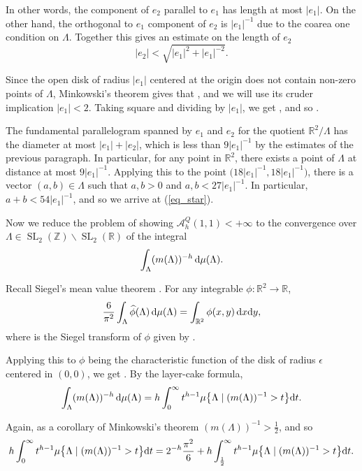 \documentclass[pdftex]{sigma}
\numberwithin{equation}{section}
\theoremstyle{definition}
\begin{document}
In other words, the component of $e_2$ parallel to $e_1$ has length at most $|e_1|$. On the other hand, the orthogonal to $e_1$ component of $e_2$ is $|e_1|^{-1}$ due to the coarea one condition on $\Lambda$. Together this gives an estimate on the length of $e_2$
\[|e_2|<\sqrt{|e_1|^2+|e_1|^{-2}}.\]

Since the open disk of radius $|e_1|$ centered at the origin does not contain non-zero points of $\Lambda$, Minkowski's theorem \cite{minkowski} gives that , and we will use its cruder implication $|e_1|<2$. Taking square and dividing by $|e_1|$, we get , and so .

The fundamental parallelogram spanned by $e_1$ and $e_2$ for the quotient $\mathbb{R}^2\slash\Lambda$ has the diameter at most $|e_1|+|e_2|$, which is less than $9|e_1|^{-1}$ by the estimates of the previous paragraph. In particular, for any point in $\mathbb{R}^2$, there exists a point of $\Lambda$ at distance at most $9|e_1|^{-1}$. Applying this to the point $\bigl(18|e_1|^{-1},18|e_1|^{-1}\bigr)$, there is a vector $(a,b)\in\Lambda$ such that $a,b>0$ and $a,b<27|e_1|^{-1}$. In particular, $a+b<54|e_1|^{-1}$, and so we arrive at (\ref{eq_star}).

Now we reduce the problem of showing $\mathcal{A}^Q_h(1,1)<+\infty$ to the convergence over $\Lambda\in\operatorname{SL}_2(\mathbb{Z})\backslash\operatorname{SL}_2(\mathbb{R})$ of the integral \[\int_\Lambda (m(\Lambda))^{-h}\, {\rm d}\mu(\Lambda).\]

Recall Siegel's mean value theorem \cite{siegel}. For any integrable $\phi\colon\mathbb{R}^2\rightarrow\mathbb{R}$,
\[
\frac{6}{\pi^2}\int_\Lambda\widehat\phi(\Lambda)\, {\rm d}\mu(\Lambda)=\int_{\mathbb{R}^2}\phi(x,y)\, {\rm d}x{\rm d}y,
\]
where \smash{$\widehat\phi$} is the Siegel transform of $\phi$ given by .

Applying this to $\phi$ being the characteristic function of the disk of radius $\epsilon$ centered in $(0,0)$, we get . By the layer-cake formula,
\[
\int_\Lambda (m(\Lambda))^{-h}\,{\rm d}\mu(\Lambda)=h\int_{0}^\infty t^{h-1} \mu\bigl\{\Lambda\mid (m(\Lambda))^{-1}>t\bigr\} {\rm d}t.
\]

Again, as a corollary of Minkowski's theorem $(m(\Lambda))^{-1}>\frac{1}{2}$, and so
\[
h\int_{0}^\infty t^{h-1} \mu\bigl\{\Lambda\mid (m(\Lambda))^{-1}>t\bigr\} {\rm d}t=2^{-h}\frac{\pi^2}{6}+h\int_{\frac{1}{2}}^\infty t^{h-1} \mu\bigl\{\Lambda\mid (m(\Lambda))^{-1}>t\bigr\} {\rm d}t.
\]
\end{document}
